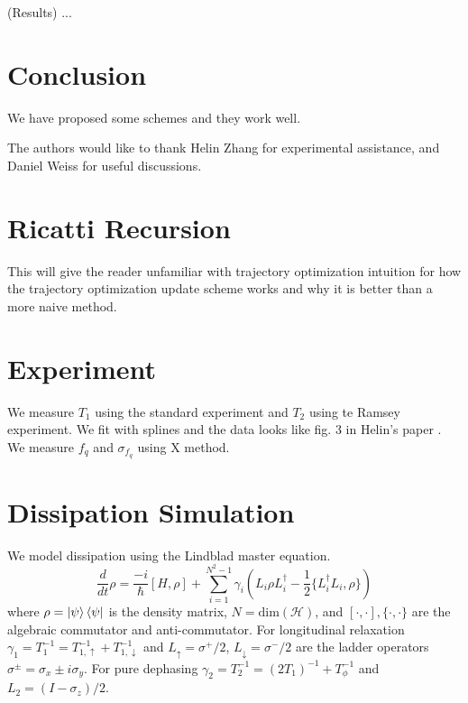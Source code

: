 \documentclass[
  amsfonts,
  amsmath,
  tbtags,
  amssymb,
  aps,
  nobibnotes,
  twocolumn,
  superscriptaddress,
]{revtex4-2}
\begin{document}
(Results) ...


\section{Conclusion}
We have proposed some schemes and they work well.


\begin{acknowledgments}
  The authors would like to thank Helin Zhang for experimental assistance,
  and Daniel Weiss for useful discussions.
\end{acknowledgments}


\appendix
\section{Ricatti Recursion}
This will give the reader unfamiliar with trajectory
optimization intuition for how the trajectory optimization
update scheme works and why it is better than
a more naive method.


\section{Experiment}
We measure $T_{1}$ using the standard experiment
and $T_{2}$ using te Ramsey experiment. We fit with splines
and the data looks like fig. 3 in Helin's paper \cite{zhang2020universal}.
We measure $f_{q}$ and $\sigma_{f_{q}}$ using X method.


\section{Dissipation Simulation}
We model dissipation using the Lindblad master
equation. 
\begin{equation}
  \frac{d}{dt} \rho = \frac{-i}{\hbar} [H, \rho] + \sum_{i = 1}^{N^{2} - 1} \gamma_{i} (L_{i} \rho L_{i}^{\dagger} - \frac{1}{2} \{L_{i}^{\dagger} L_{i}, \rho\})
\end{equation}
where $\rho = \ket{\psi}\bra{\psi}$ is the density matrix, $N = \textrm{dim}(\mathcal{H})$,
and $[\cdot, \cdot], \{\cdot, \cdot \}$ are the algebraic commutator and anti-commutator.
For longitudinal relaxation $\gamma_{1} = T_{1}^{-1} = T_{1, \uparrow}^{-1} + T_{1, \downarrow}^{-1}$
and $L_{\uparrow} = \sigma^{+}/2$,
$L_{\downarrow} = \sigma^{-}/2$
are the ladder operators $\sigma^{\pm} = \sigma_{x} \pm i \sigma_{y}$. For pure dephasing
$\gamma_{2} = T_{2}^{-1} = (2 T_{1})^{-1} + T_{\phi}^{-1}$ and
$L_{2} = (I - \sigma_{z})/2$.
\end{document}
